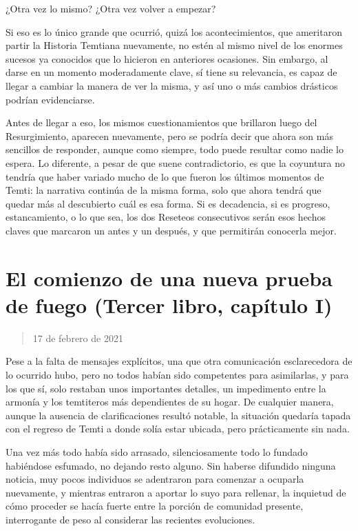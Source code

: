 \documentclass[
]{book}
\begin{document}
¿Otra vez lo mismo? ¿Otra vez volver a empezar?

Si eso es lo único grande que ocurrió, quizá los acontecimientos, que ameritaron partir la Historia Temtiana nuevamente, no estén al mismo nivel de los enormes sucesos ya conocidos que lo hicieron en anteriores ocasiones. Sin embargo, al darse en un momento moderadamente clave, sí tiene su relevancia, es capaz de llegar a cambiar la manera de ver la misma, y así uno o más cambios drásticos podrían evidenciarse.

Antes de llegar a eso, los mismos cuestionamientos que brillaron luego del Resurgimiento, aparecen nuevamente, pero se podría decir que ahora son más sencillos de responder, aunque como siempre, todo puede resultar como nadie lo espera. Lo diferente, a pesar de que suene contradictorio, es que la coyuntura no tendría que haber variado mucho de lo que fueron los últimos momentos de Temti: la narrativa continúa de la misma forma, solo que ahora tendrá que quedar más al descubierto cuál es esa forma. Si es decadencia, si es progreso, estancamiento, o lo que sea, los dos Reseteos consecutivos serán esos hechos claves que marcaron un antes y un después, y que permitirán conocerla mejor.

\hypertarget{el-comienzo-de-una-nueva-prueba-de-fuego-tercer-libro-capuxedtulo-i}{%
\section{El comienzo de una nueva prueba de fuego (Tercer libro, capítulo I)}\label{el-comienzo-de-una-nueva-prueba-de-fuego-tercer-libro-capuxedtulo-i}}

\begin{quote}
17 de febrero de 2021
\end{quote}

Pese a la falta de mensajes explícitos, una que otra comunicación esclarecedora de lo ocurrido hubo, pero no todos habían sido competentes para asimilarlas, y para los que sí, solo restaban unos importantes detalles, un impedimento entre la armonía y los temtiteros más dependientes de su hogar. De cualquier manera, aunque la ausencia de clarificaciones resultó notable, la situación quedaría tapada con el regreso de Temti a donde solía estar ubicada, pero prácticamente sin nada.

Una vez más todo había sido arrasado, silenciosamente todo lo fundado habiéndose esfumado, no dejando resto alguno. Sin haberse difundido ninguna noticia, muy pocos individuos se adentraron para comenzar a ocuparla nuevamente, y mientras entraron a aportar lo suyo para rellenar, la inquietud de cómo proceder se hacía fuerte entre la porción de comunidad presente, interrogante de peso al considerar las recientes evoluciones.
\end{document}
